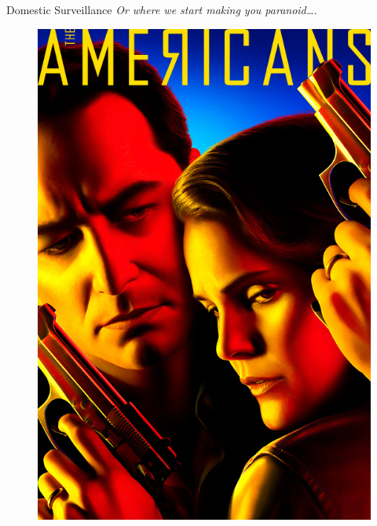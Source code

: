 \documentclass[nobackground,dvipsnames,table,aspectratio=169]{beamer}
\begin{document}
\begin{frame}{Domestic Surveillance}
    \centering
    \textit{Or where we start making you paranoid….}
    \begin{figure}
        \centering
        \includegraphics[height=0.6\textheight]{americans-poster}
    \end{figure}
\end{frame}
\end{document}
